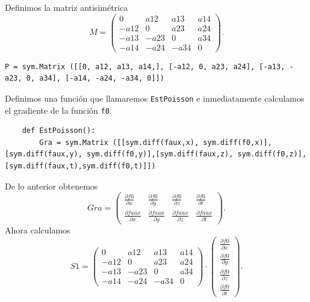 \documentclass[a4paper,10pt]{book}
\begin{document}
Definimos la matriz antisim\'etrica 
\[  M = \left( \begin{array}{cccc}
              0   & a12  & a13  & a14  \\
             -a12 & 0    & a23  & a24  \\
             -a13 & -a23 & 0    & a34  \\
             -a14 & -a24 & -a34 & 0   
             \end{array}
   \right). \]
\begin{lstlisting}
P = sym.Matrix ([[0, a12, a13, a14,], [-a12, 0, a23, a24], [-a13, -a23, 0, a34], [-a14, -a24, -a34, 0]])
\end{lstlisting}
Definimos una funci\'on que llamaremos \texttt{EstPoisson} e inmediatamente calculamos el gradiente de la funci\'on \texttt{f0}. 
\begin{lstlisting}    
    def EstPoisson():
        Gra = sym.Matrix ([[sym.diff(faux,x), sym.diff(f0,x)],[sym.diff(faux,y), sym.diff(f0,y)],[sym.diff(faux,z), sym.diff(f0,z)],[sym.diff(faux,t),sym.diff(f0,t)]])
\end{lstlisting}
De lo anterior obtenemos 
\[ Gra = \left( \begin{array}{cccc}
               \frac{\partial f0}{\partial x} & \frac{\partial f0}{\partial y} & \frac{\partial f0}{\partial z} & \frac{\partial f0}{\partial t}  \\
               \frac{\partial faux}{\partial x} & \frac{\partial faux}{\partial y} &  \frac{\partial faux}{\partial z} & \frac{\partial faux}{\partial t}    
             \end{array}
   \right).\] 
Ahora calculamos  
\[ S1 = \left( \begin{array}{cccc}
              0   & a12  & a13  & a14  \\
             -a12 & 0    & a23  & a24  \\
             -a13 & -a23 & 0    & a34  \\
             -a14 & -a24 & -a34 & 0   
             \end{array}
   \right) \cdot \left( \begin{array}{c}
               			\frac{\partial f0}{\partial x} \\
               			\frac{\partial f0}{\partial y} \\ 
               			\frac{\partial f0}{\partial z} \\
               			\frac{\partial f0}{\partial t}  
                   		\end{array}
                 \right).\]   
\end{document}
